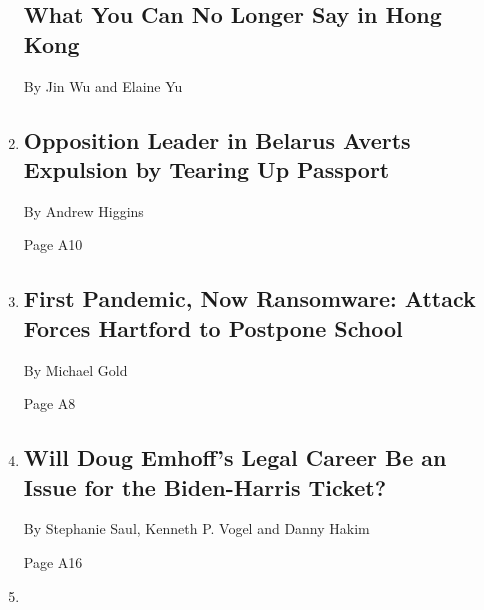 \begin{enumerate}
  \hypertarget{what-you-can-no-longer-say-in-hong-kong}{%
  \subsection{What You Can No Longer Say in Hong
  Kong}\label{what-you-can-no-longer-say-in-hong-kong}}

  By Jin Wu and Elaine Yu
\item
  \href{/2020/09/08/world/europe/belarus-maria-kolesnikova.html}{}

  \hypertarget{opposition-leader-in-belarus-averts-expulsion-by-tearing-up-passport}{%
  \subsection{Opposition Leader in Belarus Averts Expulsion by Tearing
  Up
  Passport}\label{opposition-leader-in-belarus-averts-expulsion-by-tearing-up-passport}}

  By Andrew Higgins

  Page A10
\item
  \href{/2020/09/08/nyregion/hartford-schools-ransomware.html}{}

  \hypertarget{first-pandemic-now-ransomware-attack-forces-hartford-to-postpone-school}{%
  \subsection{First Pandemic, Now Ransomware: Attack Forces Hartford to
  Postpone
  School}\label{first-pandemic-now-ransomware-attack-forces-hartford-to-postpone-school}}

  By Michael Gold

  Page A8
\item
  \href{/2020/09/08/us/politics/doug-emhoff-kamala-harris-law.html}{}

  \hypertarget{will-doug-emhoffs-legal-career-be-an-issue-for-the-biden-harris-ticket}{%
  \subsection{Will Doug Emhoff's Legal Career Be an Issue for the
  Biden-Harris
  Ticket?}\label{will-doug-emhoffs-legal-career-be-an-issue-for-the-biden-harris-ticket}}

  By Stephanie Saul, Kenneth P. Vogel and Danny Hakim

  Page A16
\item
  \href{/2020/08/26/us/voting-meaning-women-suffrage.html}{}


\end{enumerate}
